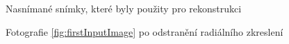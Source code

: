\documentclass[11pt,oneside,a4paper,pdftex]{article}   %
\begin{document}
\begin{figure}[htb]
{				\fbox{\begin{minipage}{3cm}\hfill\vspace{4cm}\end{minipage}}
			}
		\caption{Nasnímané snímky, které byly použity pro rekonstrukci}
		\label{fig:inputPictures}
	\end{figure}

	\begin{figure}[htb]
		\centering
		\caption{Fotografie \ref{fig:firstInputImage} po odstranění radiálního zkreslení}
		\label{fig:linearizedPictureExample}
	\end{figure}
\end{document}
